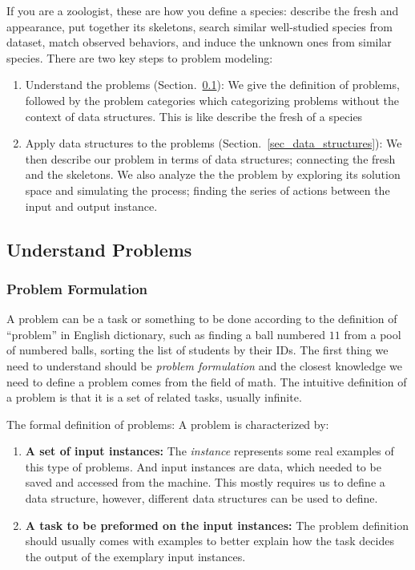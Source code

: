 \documentclass[../main.tex]{subfiles}
\begin{document}
If you are a zoologist, these are how you define a species: describe the fresh and appearance, put together its skeletons, search similar well-studied species from dataset, match observed behaviors,  and induce the unknown ones from similar species.   There are two key steps to problem modeling:
\begin{enumerate}
    \item Understand the problems (Section.~\ref{sec_problem_statement}): We give the definition of problems, followed by the problem categories which categorizing problems without the context of data structures. This is like describe the fresh of a species
    \item Apply data structures to the problems (Section.~\ref{sec_data_structures}): We then describe our problem in terms of data structures; connecting the fresh and the skeletons. We also analyze the the problem by exploring its solution space and simulating the process; finding the series of actions between the input and output instance. 
\end{enumerate}

\subsection{Understand Problems}
\label{sec_problem_statement}
\subsubsection{Problem Formulation} A problem can be a task or something to be done according to the definition of ``problem'' in English dictionary, such as finding a ball numbered $11$ from a pool of numbered balls,  sorting the list of students by their IDs. The first thing we need to understand should be \textit{problem formulation} and the closest knowledge we need to define a problem comes from the field of math. The intuitive definition of a problem is that it is a set of related tasks, usually infinite. 

The formal definition of problems: A problem is characterized by:
\begin{enumerate}
    \item \textbf{A set of input instances:} The \textit{instance} represents some real examples of this type of problems. And input instances are data, which needed to be saved and accessed from the machine. This mostly requires us to define a data structure, however, different data structures can be used to define.
    \item \textbf{A task to be preformed on the input instances:} The problem definition should usually comes with examples to better explain how the task decides the output of the exemplary input instances.
\end{enumerate}
\end{document}
